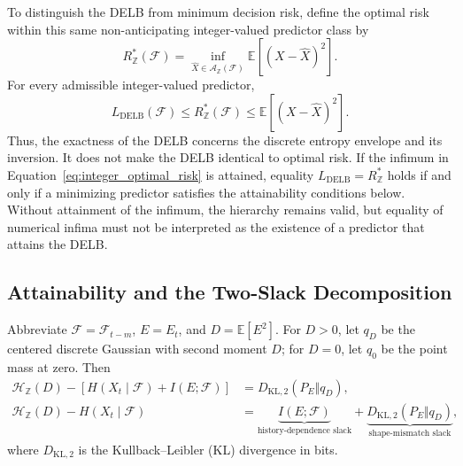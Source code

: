 \documentclass[applsci,article,accept,moreauthors]{Definitions/mdpi}
\begin{document}
To distinguish the DELB from minimum decision risk, define the optimal risk
within this same non-anticipating integer-valued predictor class by
\begin{equation}
R_{\mathbb Z}^{*}(\mathcal F)
=
\inf_{\widehat X\in\mathcal A_{\mathbb Z}(\mathcal F)}
\mathbb E[(X-\widehat X)^2].
\label{eq:integer_optimal_risk}
\end{equation}
For every admissible integer-valued predictor,
\begin{equation}
L_{\mathrm{DELB}}(\mathcal F)
\leq
R_{\mathbb Z}^{*}(\mathcal F)
\leq
\mathbb E[(X-\widehat X)^2].
\label{eq:delb_bayes_risk_hierarchy}
\end{equation}
Thus, the exactness of the DELB concerns the discrete entropy envelope and
its inversion. It does not make the DELB identical to optimal risk. If the
infimum in Equation~\eqref{eq:integer_optimal_risk} is attained, equality
\(L_{\mathrm{DELB}}=R_{\mathbb Z}^{*}\) holds if and only if a minimizing
predictor satisfies the attainability conditions below. Without attainment
of the infimum, the hierarchy remains valid, but equality of numerical
infima must not be interpreted as the existence of a predictor that attains
the DELB.

\subsection{Attainability and the Two-Slack Decomposition}
\label{subsec:attainability}

\begin{Proposition}
\label{prop:attainability_decomposition}
Abbreviate \(\mathcal F=\mathcal F_{t-m}\), \(E=E_t\), and
\(D=\mathbb E[E^2]\). For \(D>0\), let \(q_D\) be the centered discrete
Gaussian with second moment \(D\); for \(D=0\), let \(q_0\) be the point mass
at zero. Then
\begin{align}
\mathcal H_{\mathbb Z}(D)
-\left[H(X_t\mid\mathcal F)+I(E;\mathcal F)\right]
&=
D_{\mathrm{KL},2}(P_E\Vert q_D),
\label{eq:predictor_attainability_decomposition}\\
\mathcal H_{\mathbb Z}(D)-H(X_t\mid\mathcal F)
&=
\underbrace{I(E;\mathcal F)}_{\text{history-dependence slack}}
+
\underbrace{D_{\mathrm{KL},2}(P_E\Vert q_D)}_
{\text{shape-mismatch slack}},
\label{eq:universal_attainability_decomposition}
\end{align}
where \(D_{\mathrm{KL},2}\) is the Kullback--Leibler (KL) divergence in bits.
\end{Proposition}
\end{document}
